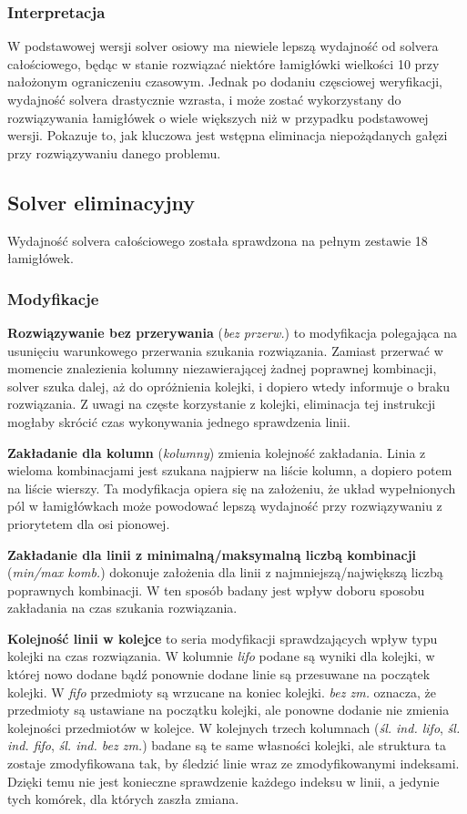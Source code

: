 \subsubsection{Interpretacja}
    W podstawowej wersji solver osiowy ma niewiele lepszą wydajność od solvera całościowego,
będąc w stanie rozwiązać niektóre łamigłówki wielkości 10 przy nałożonym ograniczeniu czasowym. 
Jednak po dodaniu częsciowej weryfikacji, wydajność solvera drastycznie wzrasta, i może zostać
wykorzystany do rozwiązywania łamigłówek o wiele większych niż w przypadku podstawowej wersji.
Pokazuje to, jak kluczowa jest wstępna eliminacja niepożądanych gałęzi przy rozwiązywaniu danego
problemu.


\subsection{Solver eliminacyjny}
    Wydajność solvera całościowego została sprawdzona na pełnym zestawie 18 łamigłówek.

\subsubsection{Modyfikacje}
    \textbf{Rozwiązywanie bez przerywania} (\textit{bez przerw.}) to modyfikacja polegająca na
usunięciu warunkowego przerwania szukania rozwiązania. Zamiast przerwać w momencie znalezienia
kolumny niezawierającej żadnej poprawnej kombinacji, solver szuka dalej, aż do opróżnienia kolejki,
i dopiero wtedy informuje o braku rozwiązania. Z uwagi na częste korzystanie z kolejki, eliminacja
tej instrukcji mogłaby skrócić czas wykonywania jednego sprawdzenia linii.

    \textbf{Zakładanie dla kolumn} (\textit{kolumny}) zmienia kolejność zakładania. Linia z wieloma
kombinacjami jest szukana najpierw na liście kolumn, a dopiero potem na liście wierszy. Ta modyfikacja
opiera się na założeniu, że układ wypełnionych pól w łamigłówkach może powodować lepszą wydajność
przy rozwiązywaniu z priorytetem dla osi pionowej.

    \textbf{Zakładanie dla linii z minimalną/maksymalną liczbą kombinacji} (\textit{min/max komb.})
dokonuje założenia dla linii z najmniejszą/największą liczbą poprawnych kombinacji. W ten sposób
badany jest wpływ doboru sposobu zakładania na czas szukania rozwiązania.

    \textbf{Kolejność linii w kolejce} to seria modyfikacji sprawdzających wpływ typu kolejki
na czas rozwiązania. W kolumnie \textit{lifo} podane są wyniki dla kolejki, w której nowo dodane
bądź ponownie dodane linie są przesuwane na początek kolejki. W \textit{fifo} przedmioty są wrzucane
na koniec kolejki. \textit{bez zm.} oznacza, że przedmioty są ustawiane na początku kolejki, ale
ponowne dodanie nie zmienia kolejności przedmiotów w kolejce. W kolejnych trzech kolumnach
(\textit{śl. ind. lifo}, \textit{śl. ind. fifo}, \textit{śl. ind. bez zm.}) badane są te same
własności kolejki, ale struktura ta zostaje zmodyfikowana tak, by śledzić linie wraz ze zmodyfikowanymi
indeksami. Dzięki temu nie jest konieczne sprawdzenie każdego indeksu w linii, a jedynie tych komórek,
dla których zaszła zmiana.



